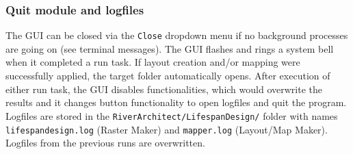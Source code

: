\subsubsection{Quit module and logfiles}
The GUI can be closed via the \texttt{Close} dropdown menu if no background processes are going on (see terminal messages). The GUI flashes and rings a system bell when it completed a run task. If layout creation and/or mapping were successfully applied, the target folder automatically opens. After execution of either run task, the GUI disables functionalities, which would overwrite the results and it changes button functionality to open logfiles and quit the program. Logfiles are stored in the \texttt{RiverArchitect/LifespanDesign/} folder with names \texttt{lifespan{\myUnderscore}design.log} (Raster Maker) and \texttt{mapper.log} (Layout/Map Maker). Logfiles from the previous runs are overwritten.



